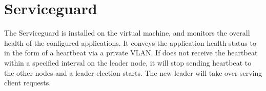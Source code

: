 \section{Serviceguard} \label{sec:guard}

The Serviceguard is installed on the virtual machine, and monitors the overall health of 
the configured applications. It conveys the application health status to \smrsystem in the 
form of a heartbeat via a private VLAN. If \smrsystem does not receive the heartbeat within 
a specified interval on the leader node, it will stop sending heartbeat to the other nodes  
and a leader election starts. The new leader will take over serving client requests. 
